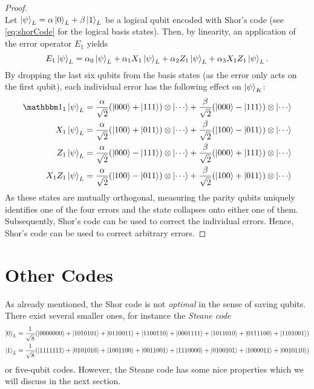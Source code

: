 \begin{proof}
\begin{equation}
				\end{equation}
				Let \( \ket{\psi}_L = \alpha \ket{0}_L + \beta \ket{1}_L \) be a logical qubit encoded with Shor's code (see \eqref{eq:shorCode} for the logical basis states). Then, by linearity, an application of the error operator \(E_1\) yields
				\begin{equation}
					E_1 \ket{\psi}_L = \alpha_0 \ket{\psi}_L + \alpha_1 X_1 \ket{\psi}_L + \alpha_2 Z_1 \ket{\psi}_L + \alpha_3 X_1 Z_1 \ket{\psi}_L.
				\end{equation}
				By dropping the last six qubits from the basis states (as the error only acts on the first qubit), each individual error has the following effect on \( \ket{\psi}_K \):
				\begin{align}
					  \ID_1 \ket{\psi}_L &= \frac{\alpha}{\sqrt{2}} (\ket{000} + \ket{111}) \otimes \ket{\cdots} + \frac{\beta}{\sqrt{2}} (\ket{000} - \ket{111}) \otimes \ket{\cdots} \\
					    X_1 \ket{\psi}_L &= \frac{\alpha}{\sqrt{2}} (\ket{100} + \ket{011}) \otimes \ket{\cdots} + \frac{\beta}{\sqrt{2}} (\ket{100} - \ket{011}) \otimes \ket{\cdots} \\
					    Z_1 \ket{\psi}_L &= \frac{\alpha}{\sqrt{2}} (\ket{000} - \ket{111}) \otimes \ket{\cdots} + \frac{\beta}{\sqrt{2}} (\ket{000} + \ket{111}) \otimes \ket{\cdots} \\
					X_1 Z_1 \ket{\psi}_L &= \frac{\alpha}{\sqrt{2}} (\ket{100} - \ket{011}) \otimes \ket{\cdots} + \frac{\beta}{\sqrt{2}} (\ket{100} + \ket{011}) \otimes \ket{\cdots}
				\end{align}
				As these states are mutually orthogonal, measuring the parity qubits uniquely identifies one of the four errors and the state collapses onto either one of them. Subsequently, Shor's code can be used to correct the individual errors. Hence, Shor's code can be used to correct arbitrary errors.
			\end{proof}

	\section{Other Codes}
		\label{subsec:otherCodes}

		As already mentioned, the Shor code is not \emph{optimal} in the sense of saving qubits. There exist several smaller ones, for instance the \emph{Steane code}
		\begin{align}
			\ket{0}_L &= \frac{1}{\sqrt{8}} (\ket{0000000} + \ket{1010101} + \ket{0110011} + \ket{1100110} + \ket{0001111} + \ket{1011010} + \ket{0111100} + \ket{1101001}) \\
			\ket{1}_L &= \frac{1}{\sqrt{8}} (\ket{1111111} + \ket{0101010} + \ket{1001100} + \ket{0011001} + \ket{1110000} + \ket{0100101} + \ket{1000011} + \ket{0010110})
		\end{align}
		or five-qubit codes. However, the Steane code has some nice properties which we will discuss in the next section.

